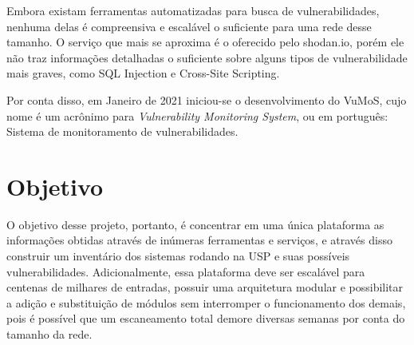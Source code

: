 Embora existam ferramentas automatizadas para busca de vulnerabilidades, nenhuma delas é compreensiva e escalável o suficiente para uma rede desse tamanho. O serviço que mais se aproxima é o oferecido pelo 
shodan.io,
porém ele não traz informações detalhadas o suficiente sobre alguns tipos de vulnerabilidade mais graves, como 
SQL Injection e Cross-Site Scripting. 

Por conta disso, em Janeiro de 2021 iniciou-se o desenvolvimento do VuMoS, cujo nome é um acrônimo para \textit{Vulnerability Monitoring System}, ou em português: Sistema de monitoramento de vulnerabilidades.



\section{Objetivo}

O objetivo desse projeto, portanto, é concentrar em uma única plataforma as informações obtidas através de inúmeras ferramentas e serviços, e através disso construir um inventário dos sistemas rodando na USP e suas possíveis vulnerabilidades. Adicionalmente, essa plataforma deve ser escalável para centenas de milhares de entradas, possuir uma arquitetura modular e possibilitar a adição e substituição de módulos sem interromper o funcionamento dos demais, pois é possível que um escaneamento total demore diversas semanas por conta do tamanho da rede. 